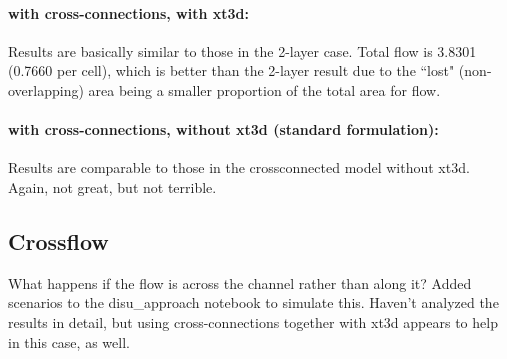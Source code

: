 \documentclass{article}
\begin{document}
\paragraph{with cross-connections, with xt3d:} Results are basically similar to those in the 2-layer case. Total flow is 3.8301 (0.7660 per cell), which is better than the 2-layer result due to the ``lost" (non-overlapping) area being a smaller proportion of the total area for flow.

\paragraph{with cross-connections, without xt3d (standard formulation):} Results are comparable to those in the crossconnected model without xt3d. Again, not great, but not terrible.

\subsection{Crossflow}
What happens if the flow is across the channel rather than along it? Added scenarios to the disu\_approach notebook to simulate this. Haven't analyzed the results in detail, but using cross-connections together with xt3d appears to help in this case, as well. 
\end{document}
